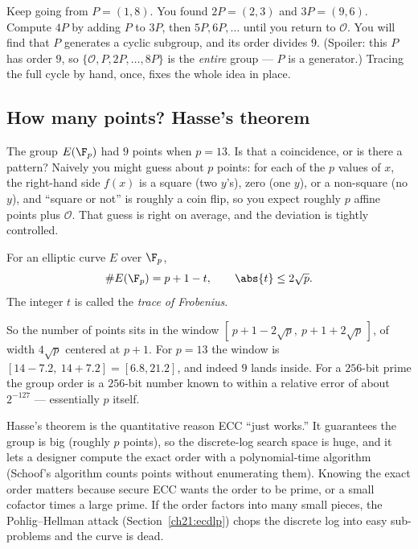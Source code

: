 \begin{labbox}
Keep going from $P=(1,8)$. You found $2P=(2,3)$ and $3P=(9,6)$. Compute $4P$ by adding
$P$ to $3P$, then $5P,6P,\dots$ until you return to $\mathcal{O}$. You will find that
$P$ generates a cyclic subgroup, and its order divides $9$. (Spoiler: this $P$ has
order $9$, so $\{\mathcal{O},P,2P,\dots,8P\}$ is the \emph{entire} group --- $P$ is a
generator.) Tracing the full cycle by hand, once, fixes the whole idea in place.
\end{labbox}

\subsection{How many points? Hasse's theorem}
\label{ch21:hasse}

The group $E(\F_p)$ had $9$ points when $p=13$. Is that a coincidence, or is there a
pattern? Naively you might guess about $p$ points: for each of the $p$ values of $x$,
the right-hand side $f(x)$ is a square (two $y$'s), zero (one $y$), or a non-square (no
$y$), and ``square or not'' is roughly a coin flip, so you expect roughly $p$ affine
points plus $\mathcal{O}$. That guess is right on average, and the deviation is tightly
controlled.

\begin{theorem}[Hasse, 1933]
\label{ch21:hasse-thm}
For an elliptic curve $E$ over $\F_p$,
\[
\#E(\F_p) = p + 1 - t, \qquad \abs{t} \le 2\sqrt{p}.
\]
The integer $t$ is called the \emph{trace of Frobenius}.
\end{theorem}

So the number of points sits in the window $[\,p+1-2\sqrt p,\ p+1+2\sqrt p\,]$, of width
$4\sqrt p$ centered at $p+1$. For $p=13$ the window is $[14 - 7.2,\ 14 + 7.2] =
[6.8, 21.2]$, and indeed $9$ lands inside. For a $256$-bit prime the group order is a
$256$-bit number known to within a relative error of about $2^{-127}$ --- essentially
$p$ itself.

\begin{whybox}
Hasse's theorem is the quantitative reason ECC ``just works.'' It guarantees the group
is big (roughly $p$ points), so the discrete-log search space is huge, and it lets a
designer compute the exact order with a polynomial-time algorithm (Schoof's algorithm
counts points without enumerating them). Knowing the exact order matters because secure
ECC wants the order to be prime, or a small cofactor times a large prime. If the order
factors into many small pieces, the Pohlig--Hellman attack (Section~\ref{ch21:ecdlp})
chops the discrete log into easy sub-problems and the curve is dead.
\end{whybox}

